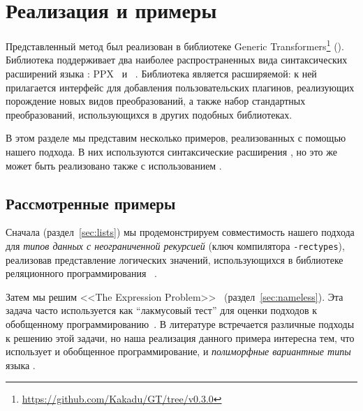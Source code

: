 \section{Реализация и примеры}
\label{sec:Evaluation}

Представленный метод был реализован в библиотеке Generic Transformers\footnote{\url{https://github.com/Kakadu/GT/tree/v0.3.0}} (\GT). Библиотека  поддерживает два наиболее распространенных вида синтаксических расширений языка \ocaml{}: \textsc{PPX}~\cite{PPXLib} и \camlpfive~\cite{camlp5}. Библиотека \GT{} является расширяемой: к ней прилагается интерфейс для добавления пользовательских плагинов, реализующих порождение новых видов преобразований, а также набор стандартных преобразований, использующихся в других подобных библиотеках.


В этом разделе мы представим несколько примеров, реализованных с помощью нашего подхода. В них используются синтаксические расширения \camlpfive{}, но это же может быть реализовано также с использованием \PPX{}. %

\subsection{Рассмотренные примеры}

Сначала (раздел~\ref{sec:lists}) мы продемонстрируем совместимость 
нашего подхода для \emph{типов данных с неограниченной рекурсией}
(ключ компилятора \texttt{-rectypes}), 
реализовав
представление логических значений, использующихся в  библиотеке реляционного программирования \OCanren{}~\cite{OCanren}. %

Затем мы решим <<The Expression Problem>>~\cite{ExpressionProblem}
 (раздел~\ref{sec:nameless}). Эта задача часто используется как ``лакмусовый тест'' для оценки подходов к обобщенному программированию~\cite{ObjectAlgebras,ALaCarte}. В литературе встречается различные подходы к решению этой задачи, но наша реализация данного примера интересна тем, что использует  и обобщенное программирование, и \emph{полиморфные вариантные типы} языка \OCaml{}.

